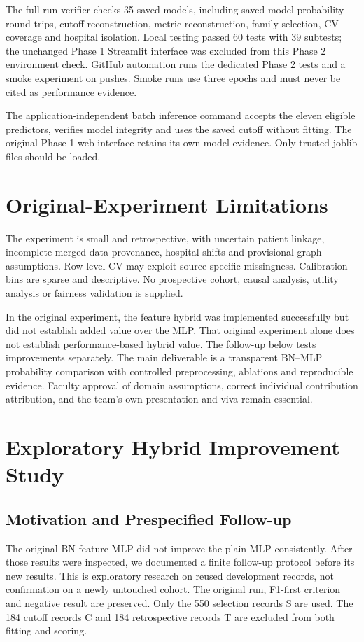 \documentclass[conference]{IEEEtran}
\begin{document}
The full-run verifier checks 35 saved models, including saved-model probability round trips, cutoff reconstruction, metric reconstruction, family selection, CV coverage and hospital isolation. Local testing passed 60 tests with 39 subtests; the unchanged Phase 1 Streamlit interface was excluded from this Phase 2 environment check. GitHub automation runs the dedicated Phase 2 tests and a smoke experiment on pushes. Smoke runs use three epochs and must never be cited as performance evidence.

The application-independent batch inference command accepts the eleven eligible predictors, verifies model integrity and uses the saved cutoff without fitting. The original Phase 1 web interface retains its own model evidence. Only trusted joblib files should be loaded.
\section{Original-Experiment Limitations}
The experiment is small and retrospective, with uncertain patient linkage, incomplete merged-data provenance, hospital shifts and provisional graph assumptions. Row-level CV may exploit source-specific missingness. Calibration bins are sparse and descriptive. No prospective cohort, causal analysis, utility analysis or fairness validation is supplied.

In the original experiment, the feature hybrid was implemented successfully but did not establish added value over the MLP. That original experiment alone does not establish performance-based hybrid value. The follow-up below tests improvements separately. The main deliverable is a transparent BN--MLP probability comparison with controlled preprocessing, ablations and reproducible evidence. Faculty approval of domain assumptions, correct individual contribution attribution, and the team's own presentation and viva remain essential.

\section{Exploratory Hybrid Improvement Study}
\subsection{Motivation and Prespecified Follow-up}
The original BN-feature MLP did not improve the plain MLP consistently. After those results were inspected, we documented a finite follow-up protocol before its new results. This is exploratory research on reused development records, not confirmation on a newly untouched cohort. The original run, F1-first criterion and negative result are preserved. Only the 550 selection records S are used. The 184 cutoff records C and 184 retrospective records T are excluded from both fitting and scoring.
\end{document}
